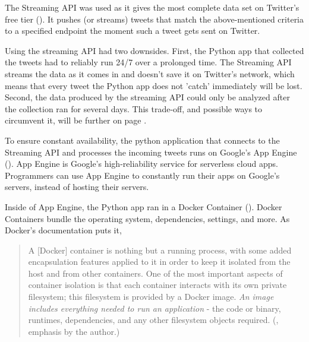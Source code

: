 The Streaming API was used as it gives the most complete data set on Twitter's free tier (\cite{brunsTwitterDataWhat2014}). It pushes (or streams) tweets that match the above-mentioned criteria to a specified endpoint the moment such a tweet gets sent on Twitter. %

Using the streaming API had two downsides. First, the Python app that collected the tweets had to reliably run 24/7 over a prolonged time. The Streaming API streams the data as it comes in and doesn't save it on Twitter's network, which means that every tweet the Python app does not 'catch' immediately will be lost. Second, the data produced by the streaming API could only be analyzed after the collection ran for several days. This trade-off, and possible ways to circumvent it, will be further on page \pageref{sec:fixedDataSet}.

To ensure constant availability, the python application that connects to the Streaming API and processes the incoming tweets runs on Google's App Engine (\cite{googleAppEngineApplication2020}). App Engine is Google's high-reliability service for serverless cloud apps. Programmers can use App Engine to constantly run their apps on Google's servers, instead of hosting their servers.

Inside of App Engine, the Python app ran in a Docker Container (\cite{merkel2014docker}). Docker Containers bundle the operating system, dependencies, settings, and more. As Docker's documentation puts it,

\begin{quote}
    A [Docker] container is nothing but a running process, with some added encapsulation features applied to it in order to keep it isolated from the host and from other containers. One of the most important aspects of container isolation is that each container interacts with its own private filesystem; this filesystem is provided by a Docker image. \emph{An image includes everything needed to run an application} - the code or binary, runtimes, dependencies, and any other filesystem objects required. (\cite{dockerOrientationSetup2020}, emphasis by the author.)
\end{quote}

